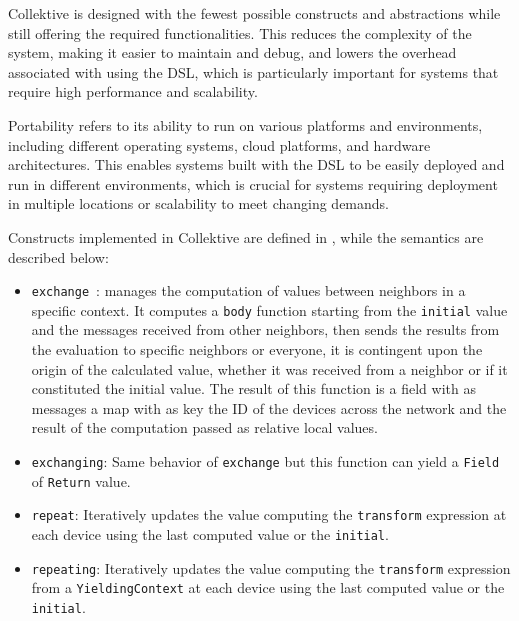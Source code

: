 Collektive is designed with the fewest possible constructs and abstractions while still offering the required functionalities. This reduces the complexity of the system, making it easier to maintain and debug, and lowers the overhead associated with using the DSL, which is particularly important for systems that require high performance and scalability.

Portability refers to its ability to run on various platforms and environments, including different operating systems, cloud platforms, and hardware architectures. This enables systems built with the DSL to be easily deployed and run in different environments, which is crucial for systems requiring deployment in multiple locations or scalability to meet changing demands.

Constructs implemented in Collektive are defined in , while the semantics are described below:

\begin{itemize}
    \item \texttt{exchange}~\cite{https://doi.org/10.4230/lipics.ecoop.2022.20}: manages the computation of values between neighbors in a specific context. It computes a \texttt{body} function starting from the \texttt{initial} value and the messages received from other neighbors, then sends the results from the evaluation to specific neighbors or everyone, it is contingent upon the origin of the calculated value, whether it was received from a neighbor or if it constituted the initial value. The result of this function is a field with as messages a map with as key the ID of the devices across the network and the result of the computation passed as relative local values.
    \item \texttt{exchanging}: Same behavior of \texttt{exchange} but this function can yield a \texttt{Field} of \texttt{Return} value.
    \item \texttt{repeat}: Iteratively updates the value computing the \texttt{transform} expression at each device using the last computed value or the \texttt{initial}.
    \item \texttt{repeating}: Iteratively updates the value computing the \texttt{transform} expression from a \texttt{YieldingContext} at each device using the last computed value or the \texttt{initial}.
\end{itemize}



